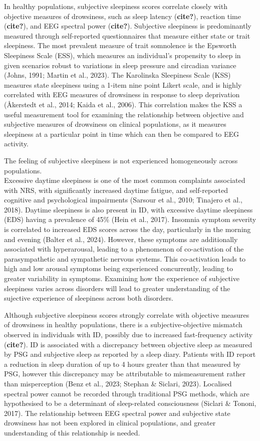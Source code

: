 \documentclass[
]{article}
\begin{document}
In healthy populations, subjective sleepiness scores correlate closely
with objective measures of drowsiness, such as sleep latency
(\textbf{cite?}), reaction time (\textbf{cite?}), and EEG spectral power
(\textbf{cite?}). Subjective sleepiness is predominantly measured
through self-reported questionnaires that measure either state or trait
sleepiness. The most prevalent measure of trait somnolence is the
Epsworth Sleepiness Scale (ESS), which measures an individual's
propensity to sleep in given scenarios robust to variations in sleep
pressure and circadian variance (Johns, 1991; Martin et al., 2023). The
Karolinska Sleepiness Scale (KSS) measures state sleepiness using a
1-item nine point Likert scale, and is highly correlated with EEG
measures of drowsiness in response to sleep deprivation (Åkerstedt et
al., 2014; Kaida et al., 2006). This correlation makes the KSS a useful
measurement tool for examining the relationship between objective and
subjective measures of drowsiness on clinical populations, as it
measures sleepiness at a particular point in time which can then be
compared to EEG activity.

The feeling of subjective sleepiness is not experienced homogeneously
across populations.\\
Excessive daytime sleepiness is one of the most common complaints
associated with NRS, with significantly increased daytime fatigue, and
self-reported cognitive and psychological impairments (Sarsour et al.,
2010; Tinajero et al., 2018). Daytime sleepiness is also present in ID,
with excessive daytime sleepiness (EDS) having a prevalence of 45\%
(Hein et al., 2017). Insomnia symptom severity is correlated to
increased EDS scores across the day, particularly in the morning and
evening (Balter et al., 2024). However, these symptoms are additionally
associated with hyperarousal, leading to a phenomenon of co-activation
of the parasympathetic and sympathetic nervous systems. This
co-activation leads to high and low arousal symptoms being experienced
concurrently, leading to greater variability in symptoms. Examining how
the experience of subjective sleepiness varies across disorders will
lead to greater understanding of the sujective experience of sleepiness
across both disorders.

Although subjective sleepiness scores strongly correlate with objective
measures of drowsiness in healthy populations, there is a
subjective-objective mismatch observed in individuals with ID, possibly
due to increased fast-frequency activity (\textbf{cite?}). ID is
associated with a discrepancy between objective sleep as measured by PSG
and subjective sleep as reported by a sleep diary. Patients with ID
report a reduction in sleep duration of up to 4 hours greater than that
measured by PSG, however this discrepancy may be attributable to
mismeasurement rather than misperception (Benz et al., 2023; Stephan \&
Siclari, 2023). Localised spectral power cannot be recorded through
traditional PSG methods, which are hypothesised to be a determinant of
sleep-related consciousness (Siclari \& Tononi, 2017). The relationship
between EEG spectral power and subjective state drowsiness has not been
explored in clinical populations, and greater understanding of this
relationship is needed.
\end{document}
